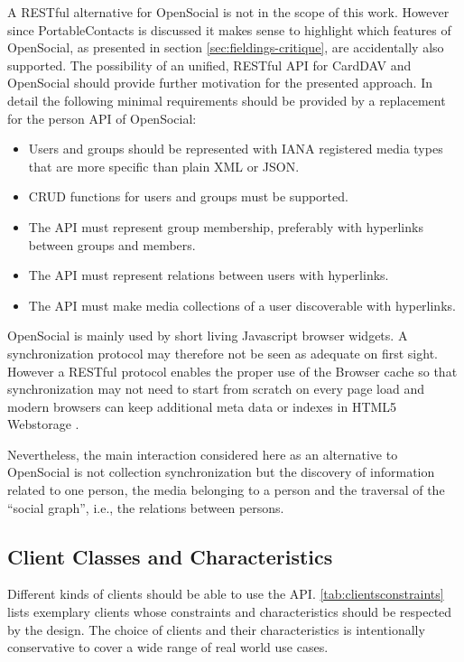 \documentclass[11pt,a4paper,headsepline,twoside]{scrartcl}		%
\begin{document}
A RESTful alternative for OpenSocial is not in the scope of this work. However
since PortableContacts is discussed it makes sense to highlight which features
of OpenSocial, as presented in section \ref{sec:fieldings-critique}, are
accidentally also supported. The possibility of an unified, RESTful API for
CardDAV and OpenSocial should provide further motivation for the presented
approach. In detail the following minimal requirements should be provided by a
replacement for the person API of OpenSocial:

\begin{itemize}
\item Users and groups should be represented with IANA registered media types
  that are more specific than plain XML or JSON.
\item CRUD functions for users and groups must be supported.
\item The API must represent group membership, preferably with hyperlinks
  between groups and members.
\item The API must represent relations between users with hyperlinks.
\item The API must make media collections of a user discoverable with
  hyperlinks.
\end{itemize}

OpenSocial is mainly used by short living Javascript browser widgets. A
synchronization protocol may therefore not be seen as adequate on first
sight. However a RESTful protocol enables the proper use of the Browser cache so
that synchronization may not need to start from scratch on every page load and
modern browsers can keep additional meta data or indexes in HTML5
Webstorage \cite{Hickson2011b}.

Nevertheless, the main interaction considered here as an alternative to
OpenSocial is not collection synchronization but the discovery of information
related to one person, the media belonging to a person and the traversal of the
``social graph'', i.e., the relations between persons.

\subsection{Client Classes and Characteristics}
\label{sec:user-class-char}

Different kinds of clients should be able to use the API.
\autoref{tab:clientsconstraints} lists exemplary clients whose constraints and
characteristics should be respected by the design. The choice of clients and
their characteristics is intentionally conservative to cover a wide range of
real world use cases.
\end{document}
